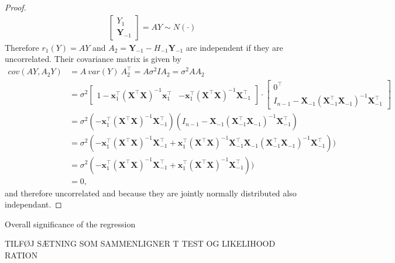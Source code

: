 \begin{proof}
\begin{align*}
\begin{bmatrix}
            Y_1 \\
            \textbf{Y}_{-1}
        \end{bmatrix}
        =
        AY \sim N(\cdot)
    \end{align*}
    Therefore $r_1(Y) = AY$ and $A_2 = \textbf{Y}_{-1} - H_{-1} \textbf{Y}_{-1}$ are independent if they are uncorrelated. Their covariance matrix is given by 
    \begin{align*}
        cov(A Y, A_2 Y) &= A\  var(Y) \ A_2^\top = A \sigma^2 I A_2 = \sigma^2 A A_2 \\
        &= \sigma^2 
        \begin{bmatrix}
            1 - \textbf{x}_1^\top (\textbf{X}^\top \textbf{X})^{-1} \textbf{x}_1^\top & - \textbf{x}_1^\top (\textbf{X}^\top \textbf{X})^{-1} \textbf{X}_{-1}^\top
        \end{bmatrix}
        \cdot
        \begin{bmatrix}
            0^\top \\
            I_{n-1} - \textbf{X}_{-1} (\textbf{X}_{-1}^\top \textbf{X}_{-1})^{-1} \textbf{X}_{-1}^\top
        \end{bmatrix} \\
        &= \sigma^2 (- \textbf{x}_1^\top (\textbf{X}^\top \textbf{X})^{-1} \textbf{X}_{-1}^\top) (I_{n-1} - \textbf{X}_{-1} (\textbf{X}_{-1}^\top \textbf{X}_{-1})^{-1} \textbf{X}_{-1}^\top) \\
        &= \sigma^2 (- \textbf{x}_1^\top (\textbf{X}^\top \textbf{X})^{-1} \textbf{X}_{-1}^\top + \textbf{x}_1^\top (\textbf{X}^\top \textbf{X})^{-1} \textbf{X}_{-1}^\top \textbf{X}_{-1} (\textbf{X}_{-1}^\top \textbf{X}_{-1})^{-1} \textbf{X}_{-1}^\top)) \\
        &= \sigma^2 (- \textbf{x}_1^\top (\textbf{X}^\top \textbf{X})^{-1} \textbf{X}_{-1}^\top + \textbf{x}_1^\top (\textbf{X}^\top \textbf{X})^{-1} \textbf{X}_{-1}^\top)) \\
        &= 0,
    \end{align*}
    and therefore uncorrelated and because they are jointly normally distributed also independant.
\end{proof}

Overall significance of the regression

TILFØJ SÆTNING SOM SAMMENLIGNER T TEST OG LIKELIHOOD RATION





